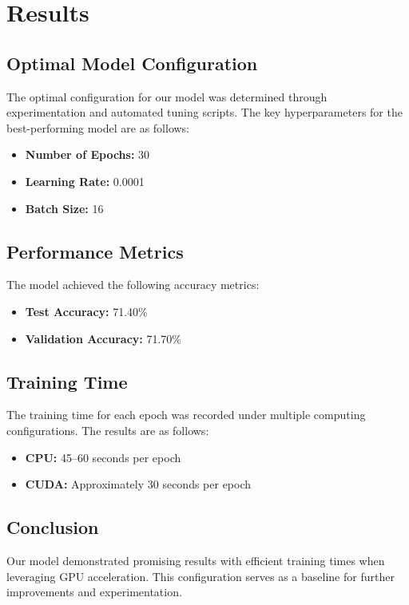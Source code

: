 \documentclass{article}
\begin{document}
\section{Results}

\subsection{Optimal Model Configuration}
The optimal configuration for our model was determined through experimentation and automated tuning scripts. The key hyperparameters for the best-performing model are as follows:
\begin{itemize}
    \item \textbf{Number of Epochs:} 30
    \item \textbf{Learning Rate:} 0.0001
    \item \textbf{Batch Size:} 16
\end{itemize}

\subsection{Performance Metrics}
The model achieved the following accuracy metrics:
\begin{itemize}
    \item \textbf{Test Accuracy:} 71.40\%
    \item \textbf{Validation Accuracy:} 71.70\%
\end{itemize}

\subsection{Training Time}
The training time for each epoch was recorded under multiple computing configurations. The results are as follows:
\begin{itemize}
    \item \textbf{CPU:} 45--60 seconds per epoch
    \item \textbf{CUDA:} Approximately 30 seconds per epoch
\end{itemize}

\subsection{Conclusion}
Our model demonstrated promising results with efficient training times when leveraging GPU acceleration. This configuration serves as a baseline for further improvements and experimentation.
\end{document}
